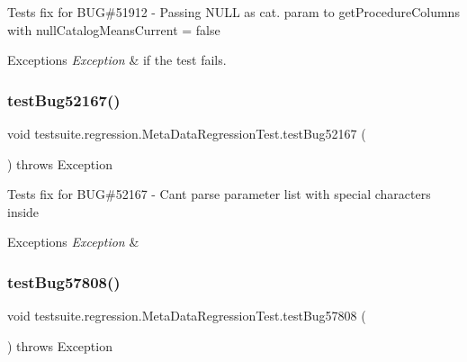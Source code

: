 Tests fix for B\+UG\#51912 -\/ Passing N\+U\+LL as cat. param to get\+Procedure\+Columns with null\+Catalog\+Means\+Current = false


\begin{DoxyExceptions}{Exceptions}
{\em Exception} & if the test fails. \\
\hline
\end{DoxyExceptions}
\mbox{\label{classtestsuite_1_1regression_1_1_meta_data_regression_test_a9fe48a9548719aa95df0a85252333e6c}} 
\subsubsection{\texorpdfstring{test\+Bug52167()}{testBug52167()}}
{\footnotesize\ttfamily void testsuite.\+regression.\+Meta\+Data\+Regression\+Test.\+test\+Bug52167 (\begin{DoxyParamCaption}{ }\end{DoxyParamCaption}) throws Exception}

Tests fix for B\+UG\#52167 -\/ Can\textquotesingle{}t parse parameter list with special characters inside


\begin{DoxyExceptions}{Exceptions}
{\em Exception} & \\
\hline
\end{DoxyExceptions}
\mbox{\label{classtestsuite_1_1regression_1_1_meta_data_regression_test_ade987f06121aa11b35ee8860ae893a51}} 
\subsubsection{\texorpdfstring{test\+Bug57808()}{testBug57808()}}
{\footnotesize\ttfamily void testsuite.\+regression.\+Meta\+Data\+Regression\+Test.\+test\+Bug57808 (\begin{DoxyParamCaption}{ }\end{DoxyParamCaption}) throws Exception}

